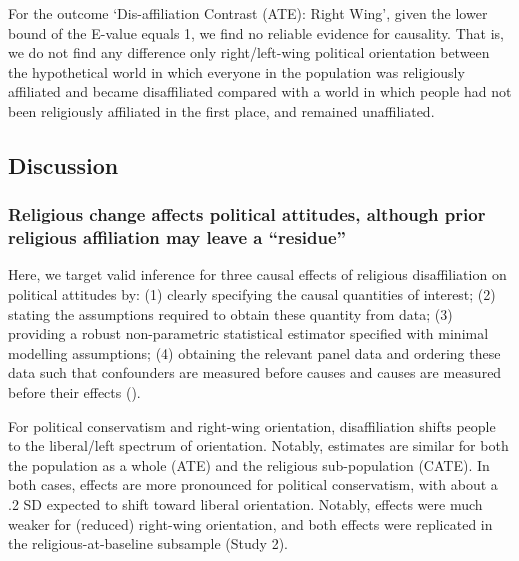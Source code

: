 \documentclass[
  singlecolumn]{article}
\begin{document}
For the outcome `Dis-affiliation Contrast (ATE): Right Wing', given the
lower bound of the E-value equals 1, we find no reliable evidence for
causality. That is, we do not find any difference only right/left-wing
political orientation between the hypothetical world in which everyone
in the population was religiously affiliated and became disaffiliated
compared with a world in which people had not been religiously
affiliated in the first place, and remained unaffiliated.

\subsection{Discussion}\label{discussion}

\subsubsection{Religious change affects political attitudes, although
prior religious affiliation may leave a
``residue''}\label{religious-change-affects-political-attitudes-although-prior-religious-affiliation-may-leave-a-residue}

Here, we target valid inference for three causal effects of religious
disaffiliation on political attitudes by: (1) clearly specifying the
causal quantities of interest; (2) stating the assumptions required to
obtain these quantity from data; (3) providing a robust non-parametric
statistical estimator specified with minimal modelling assumptions; (4)
obtaining the relevant panel data and ordering these data such that
confounders are measured before causes and causes are measured before
their effects ().

For political conservatism and right-wing orientation, disaffiliation
shifts people to the liberal/left spectrum of orientation. Notably,
estimates are similar for both the population as a whole (ATE) and the
religious sub-population (CATE). In both cases, effects are more
pronounced for political conservatism, with about a .2 SD expected to
shift toward liberal orientation. Notably, effects were much weaker for
(reduced) right-wing orientation, and both effects were replicated in
the religious-at-baseline subsample (Study 2).
\end{document}
